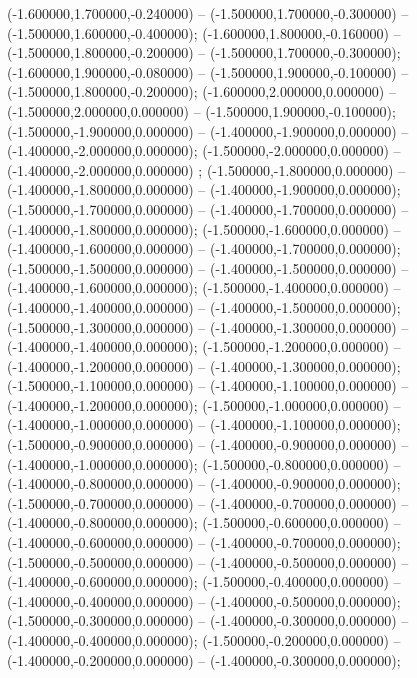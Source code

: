  (-1.600000,1.700000,-0.240000) -- (-1.500000,1.700000,-0.300000) -- (-1.500000,1.600000,-0.400000);
 (-1.600000,1.800000,-0.160000) -- (-1.500000,1.800000,-0.200000) -- (-1.500000,1.700000,-0.300000);
 (-1.600000,1.900000,-0.080000) -- (-1.500000,1.900000,-0.100000) -- (-1.500000,1.800000,-0.200000);
 (-1.600000,2.000000,0.000000) -- (-1.500000,2.000000,0.000000) -- (-1.500000,1.900000,-0.100000);
 (-1.500000,-1.900000,0.000000) -- (-1.400000,-1.900000,0.000000) -- (-1.400000,-2.000000,0.000000);
 (-1.500000,-2.000000,0.000000) -- (-1.400000,-2.000000,0.000000) ;
 (-1.500000,-1.800000,0.000000) -- (-1.400000,-1.800000,0.000000) -- (-1.400000,-1.900000,0.000000);
 (-1.500000,-1.700000,0.000000) -- (-1.400000,-1.700000,0.000000) -- (-1.400000,-1.800000,0.000000);
 (-1.500000,-1.600000,0.000000) -- (-1.400000,-1.600000,0.000000) -- (-1.400000,-1.700000,0.000000);
 (-1.500000,-1.500000,0.000000) -- (-1.400000,-1.500000,0.000000) -- (-1.400000,-1.600000,0.000000);
 (-1.500000,-1.400000,0.000000) -- (-1.400000,-1.400000,0.000000) -- (-1.400000,-1.500000,0.000000);
 (-1.500000,-1.300000,0.000000) -- (-1.400000,-1.300000,0.000000) -- (-1.400000,-1.400000,0.000000);
 (-1.500000,-1.200000,0.000000) -- (-1.400000,-1.200000,0.000000) -- (-1.400000,-1.300000,0.000000);
 (-1.500000,-1.100000,0.000000) -- (-1.400000,-1.100000,0.000000) -- (-1.400000,-1.200000,0.000000);
 (-1.500000,-1.000000,0.000000) -- (-1.400000,-1.000000,0.000000) -- (-1.400000,-1.100000,0.000000);
 (-1.500000,-0.900000,0.000000) -- (-1.400000,-0.900000,0.000000) -- (-1.400000,-1.000000,0.000000);
 (-1.500000,-0.800000,0.000000) -- (-1.400000,-0.800000,0.000000) -- (-1.400000,-0.900000,0.000000);
 (-1.500000,-0.700000,0.000000) -- (-1.400000,-0.700000,0.000000) -- (-1.400000,-0.800000,0.000000);
 (-1.500000,-0.600000,0.000000) -- (-1.400000,-0.600000,0.000000) -- (-1.400000,-0.700000,0.000000);
 (-1.500000,-0.500000,0.000000) -- (-1.400000,-0.500000,0.000000) -- (-1.400000,-0.600000,0.000000);
 (-1.500000,-0.400000,0.000000) -- (-1.400000,-0.400000,0.000000) -- (-1.400000,-0.500000,0.000000);
 (-1.500000,-0.300000,0.000000) -- (-1.400000,-0.300000,0.000000) -- (-1.400000,-0.400000,0.000000);
 (-1.500000,-0.200000,0.000000) -- (-1.400000,-0.200000,0.000000) -- (-1.400000,-0.300000,0.000000);
